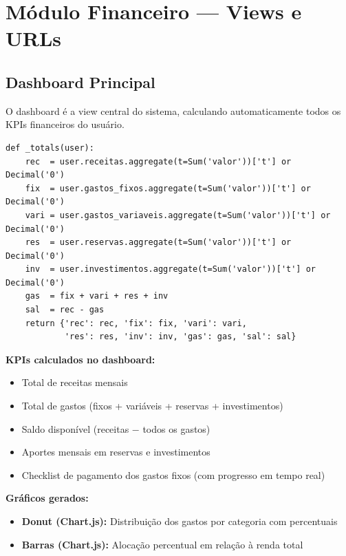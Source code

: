 \documentclass[12pt, a4paper, oneside]{report}
\begin{document}
\chapter{Módulo Financeiro — Views e URLs}

\section{Dashboard Principal}

O dashboard é a view central do sistema, calculando automaticamente todos os KPIs financeiros do usuário.

\begin{lstlisting}[style=django, caption={finance/views.py — Helper de totais}]
def _totals(user):
    rec  = user.receitas.aggregate(t=Sum('valor'))['t'] or Decimal('0')
    fix  = user.gastos_fixos.aggregate(t=Sum('valor'))['t'] or Decimal('0')
    vari = user.gastos_variaveis.aggregate(t=Sum('valor'))['t'] or Decimal('0')
    res  = user.reservas.aggregate(t=Sum('valor'))['t'] or Decimal('0')
    inv  = user.investimentos.aggregate(t=Sum('valor'))['t'] or Decimal('0')
    gas  = fix + vari + res + inv
    sal  = rec - gas
    return {'rec': rec, 'fix': fix, 'vari': vari,
            'res': res, 'inv': inv, 'gas': gas, 'sal': sal}
\end{lstlisting}

\textbf{KPIs calculados no dashboard:}

\begin{itemize}
  \item Total de receitas mensais
  \item Total de gastos (fixos + variáveis + reservas + investimentos)
  \item Saldo disponível (receitas $-$ todos os gastos)
  \item Aportes mensais em reservas e investimentos
  \item Checklist de pagamento dos gastos fixos (com progresso em tempo real)
\end{itemize}

\textbf{Gráficos gerados:}
\begin{itemize}
  \item \textbf{Donut (Chart.js):} Distribuição dos gastos por categoria com percentuais
  \item \textbf{Barras (Chart.js):} Alocação percentual em relação à renda total
\end{itemize}
\end{document}
